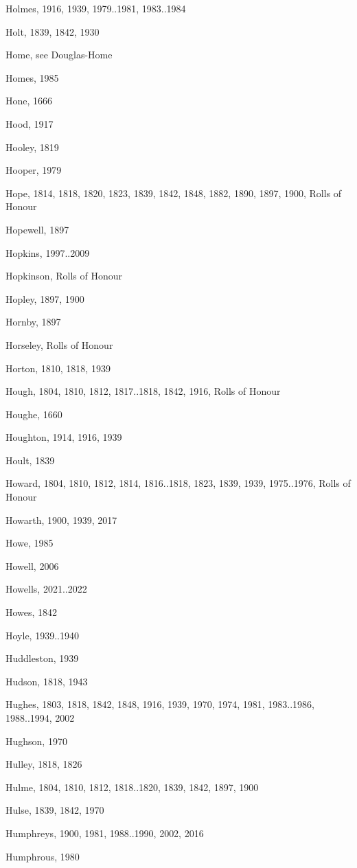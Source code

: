 {\begin{theindex}
\item Holmes, 1916, 1939, 1979..1981, 1983..1984
\item Holt, 1839, 1842, 1930
\item Home, see Douglas-Home
\item Homes, 1985
\item Hone, 1666
\item Hood, 1917
\item Hooley, 1819
\item Hooper, 1979
\item Hope, 1814, 1818, 1820, 1823, 1839, 1842, 1848, 1882, 1890, 1897, 1900, Rolls of Honour
\item Hopewell, 1897
\item Hopkins, 1997..2009
\item Hopkinson, Rolls of Honour
\item Hopley, 1897, 1900
\item Hornby, 1897
\item Horseley, Rolls of Honour
\item Horton, 1810, 1818, 1939
\item Hough, 1804, 1810, 1812, 1817..1818, 1842, 1916, Rolls of Honour
\item Houghe, 1660
\item Houghton, 1914, 1916, 1939
\item Hoult, 1839
\item Howard, 1804, 1810, 1812, 1814, 1816..1818, 1823, 1839, 1939, 1975..1976, Rolls of Honour
\item Howarth, 1900, 1939, 2017
\item Howe, 1985
\item Howell, 2006
\item Howells, 2021..2022
\item Howes, 1842
\item Hoyle, 1939..1940
\item Huddleston, 1939
\item Hudson, 1818, 1943
\item Hughes, 1803, 1818, 1842, 1848, 1916, 1939, 1970, 1974, 1981, 1983..1986, 1988..1994, 2002
\item Hughson, 1970
\item Hulley, 1818, 1826
\item Hulme, 1804, 1810, 1812, 1818..1820, 1839, 1842, 1897, 1900
\item Hulse, 1839, 1842, 1970
\item Humphreys, 1900, 1981, 1988..1990, 2002, 2016
\item Humphrous, 1980

\end{theindex}}
